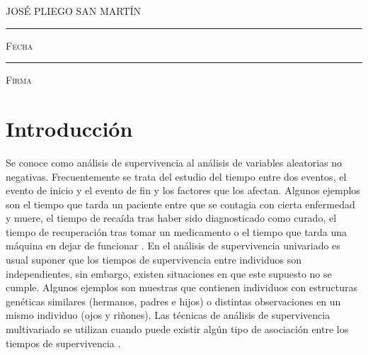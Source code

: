 \documentclass[11pt,a4paper]{article}
\begin{document}
\centering

\hspace{3em}

\textsc{JOSÉ PLIEGO SAN MARTÍN}

\vspace{5em}

\rule[1em]{20em}{0.5pt} %

\textsc{Fecha}
 
\vspace{8em}

\rule[1em]{20em}{0.5pt} %

\textsc{Firma}

\endgroup
\vspace*{\fill}

\newpage

\tableofcontents
\listoffigures
\listoftables

\newpage

\setlength{\parskip}{\baselineskip}

\section{Introducción}
\label{intro}

Se conoce como análisis de supervivencia al análisis de variables aleatorias no negativas. Frecuentemente se trata del estudio del tiempo entre dos eventos, el evento de inicio y el evento de fin y los factores que los afectan. Algunos ejemplos son el tiempo que tarda un paciente entre que se contagia con cierta enfermedad y muere, el tiempo de recaída tras haber sido diagnosticado como curado, el tiempo de recuperación tras tomar un medicamento o el tiempo que tarda una máquina en dejar de funcionar \citep{moore}. En el análisis de supervivencia univariado es usual suponer que los tiempos de supervivencia entre individuos son independientes, sin embargo, existen situaciones en que este supuesto no se cumple. Algunos ejemplos son muestras que contienen individuos con estructuras genéticas similares (hermanos, padres e hijos) o distintas observaciones en un mismo individuo (ojos y riñones). Las técnicas de análisis de supervivencia multivariado se utilizan cuando puede existir algún tipo de asociación entre los tiempos de supervivencia \citep{klein}.
\end{document}
